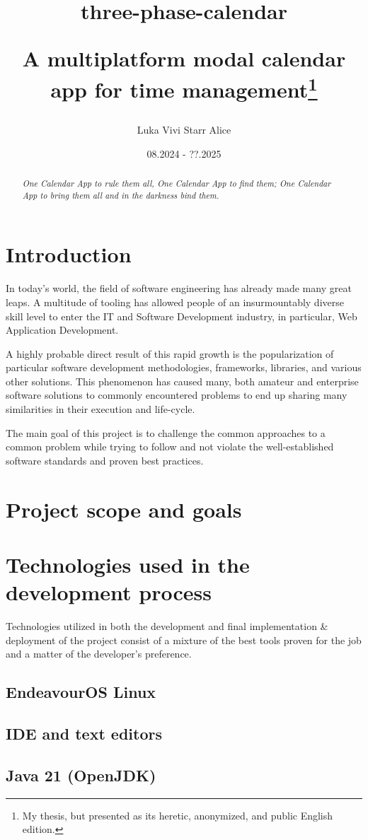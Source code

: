 \documentclass[12pt, a4paper]{article}
\title{three-phase-calendar

A multiplatform modal calendar app for time management\footnote{My thesis, but presented as its heretic, anonymized, and public English edition.}}
\author{Luka Vivi Starr Alice}
\date{08.2024 - ??.2025}
\begin{document}
\maketitle

\begin{abstract}
\textit{One Calendar App to rule them all, One Calendar App to find them; One Calendar App to bring them all and in the darkness bind them.}
\end{abstract}

\section*{Introduction}
In today's world, the field of software engineering has already made many great leaps. A multitude of tooling has allowed people of an insurmountably diverse skill level to enter the IT and Software Development industry, in particular, Web Application Development.

A highly probable direct result of this rapid growth is the popularization of particular software development methodologies, frameworks, libraries, and various other solutions. This phenomenon has caused many, both amateur and enterprise software solutions to commonly encountered problems to end up sharing many similarities in their execution and life-cycle.

The main goal of this project is to challenge the common approaches to a common problem while trying to follow and not violate the well-established software standards and proven best practices.
\section{Project scope and goals}
\section{Technologies used in the development process}
Technologies utilized in both the development and final implementation \& deployment of the project consist of a mixture of the best tools proven for the job and a matter of the developer's preference.
\subsection{EndeavourOS Linux}
\subsection{IDE and text editors}
\subsection{Java 21 (OpenJDK)}
\end{document}
